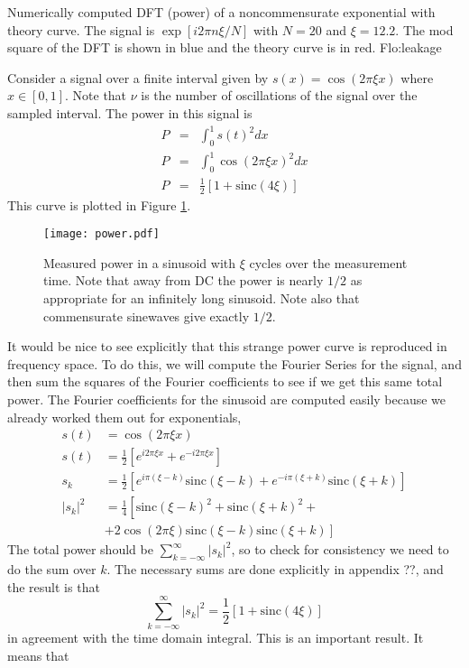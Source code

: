 {Numerically computed DFT (power) of a noncommensurate exponential
with theory curve. The signal is $\exp\left[i2\pi n\xi/N\right]$
with $N=20$ and $\xi=12.2$. The mod square of the DFT is shown in
blue and the theory curve is in red.}
{Flo:leakage}




Consider a signal over a finite interval given by $s(x)=\cos(2\pi\xi x)$
where $x\in[0,1]$. Note that $\nu$ is the number of oscillations
of the signal over the sampled interval. The power in this signal
is \begin{eqnarray*}
P & = & \int_{0}^{1}s(t)^{2}dx\\
P & = & \int_{0}^{1}\cos(2\pi\xi x)^{2}dx\\
P & = & \frac{1}{2}\left[1+\textrm{sinc}\left(4\xi\right)\right]\end{eqnarray*}
This curve is plotted in Figure \ref{Flo:PowerFromNoncommensurateSinusoid}.

%
\begin{figure}
\begin{centering}
\texttt{[image: power.pdf]}
\par\end{centering}

\caption{Measured power in a sinusoid with $\xi$ cycles over the measurement
time. Note that away from DC the power is nearly $1/2$ as appropriate
for an infinitely long sinusoid. Note also that commensurate sinewaves
give exactly $1/2$.}


\label{Flo:PowerFromNoncommensurateSinusoid}
\end{figure}


It would be nice to see explicitly that this strange power curve is
reproduced in frequency space. To do this, we will compute the Fourier
Series for the signal, and then sum the squares of the Fourier coefficients
to see if we get this same total power. The Fourier coefficients for
the sinusoid are computed easily because we already worked them out
for exponentials,\begin{align*}
s(t) & = \cos(2\pi\xi x)\\
s(t) & = \frac{1}{2}\left[e^{i2\pi\xi x}+e^{-i2\pi\xi x}\right]\\
s_{k} & = \frac{1}{2}\left[e^{i\pi(\xi-k)}\textrm{sinc}\left(\xi-k\right)+e^{-i\pi(\xi+k)}\textrm{sinc}\left(\xi+k\right)\right]\\
|s_{k}|^{2} & = \frac{1}{4}\left[\textrm{sinc}\left(\xi-k\right)^{2}+\textrm{sinc}\left(\xi+k\right)^{2}+\right.\\
 & + \left.2\cos\left(2\pi\xi\right)\textrm{sinc}\left(\xi-k\right)\textrm{sinc}\left(\xi+k\right)\right]
\end{align*}
The total power should be $\sum_{k=-\infty}^{\infty}|s_{k}|^{2}$,
so to check for consistency we need to do the sum over $k$. The necessary
sums are done explicitly in appendix ??, and the result is that\[
\sum_{k=-\infty}^{\infty}|s_{k}|^{2}=\frac{1}{2}\left[1+\textrm{sinc}\left(4\xi\right)\right]\]
in agreement with the time domain integral. This is an important result.
It means that 


